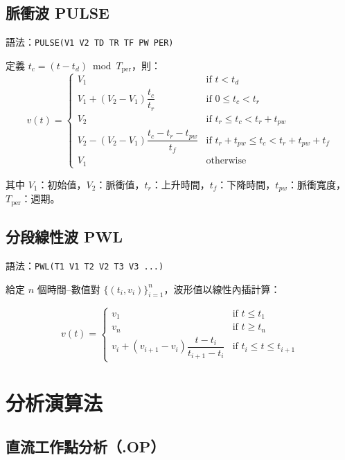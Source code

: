 \documentclass[12pt,a4paper]{article}
\begin{document}
\subsection{脈衝波 PULSE}

語法：\texttt{PULSE(V1 V2 TD TR TF PW PER)}

定義 $t_c = (t - t_d) \bmod T_{\text{per}}$，則：
\begin{equation}
v(t) = \begin{cases}
V_1 & \text{if } t < t_d \\
V_1 + (V_2 - V_1)\dfrac{t_c}{t_r} & \text{if } 0 \leq t_c < t_r \\[6pt]
V_2 & \text{if } t_r \leq t_c < t_r + t_{pw} \\[4pt]
V_2 - (V_2 - V_1)\dfrac{t_c - t_r - t_{pw}}{t_f} & \text{if } t_r + t_{pw} \leq t_c < t_r + t_{pw} + t_f \\[6pt]
V_1 & \text{otherwise}
\end{cases}
\end{equation}

\noindent 其中 $V_1$：初始值，$V_2$：脈衝值，$t_r$：上升時間，$t_f$：下降時間，$t_{pw}$：脈衝寬度，$T_{\text{per}}$：週期。

\subsection{分段線性波 PWL}

語法：\texttt{PWL(T1 V1 T2 V2 T3 V3 ...)}

給定 $n$ 個時間--數值對 $\{(t_i, v_i)\}_{i=1}^{n}$，波形值以線性內插計算：

\begin{equation}
v(t) = \begin{cases}
v_1 & \text{if } t \leq t_1 \\
v_n & \text{if } t \geq t_n \\
v_i + (v_{i+1} - v_i)\dfrac{t - t_i}{t_{i+1} - t_i} & \text{if } t_i \leq t \leq t_{i+1}
\end{cases}
\end{equation}


\section{分析演算法}

\subsection{直流工作點分析（.OP）}
\end{document}
